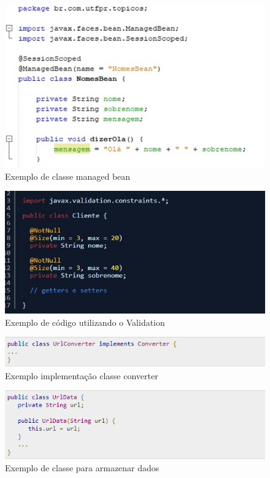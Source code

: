 \documentclass[	DIV=calc,%
							paper=a4,%
							fontsize=12pt,%
							onecolumn]{scrartcl}	 					%
\begin{document}
\begin{figure}
\centering
\includegraphics[width=\textwidth]{managed_bean}
\caption{Exemplo de classe managed bean}
\label{fig4}
\end{figure}


\begin{figure}
\centering
\includegraphics[width=\textwidth]{bean_validation}
\caption{Exemplo de código utilizando o Validation}
\label{fig5}
\end{figure}


\begin{figure}
	\centering
	\includegraphics[width=\textwidth]{converters3}
	\caption{Exemplo implementação classe converter}
	\label{fig6}
\end{figure}


\begin{figure}
	\centering
	\includegraphics[width=\textwidth]{converters4}
	\caption{Exemplo de classe para armazenar dados}
	\label{fig7}
\end{figure}
\end{document}
